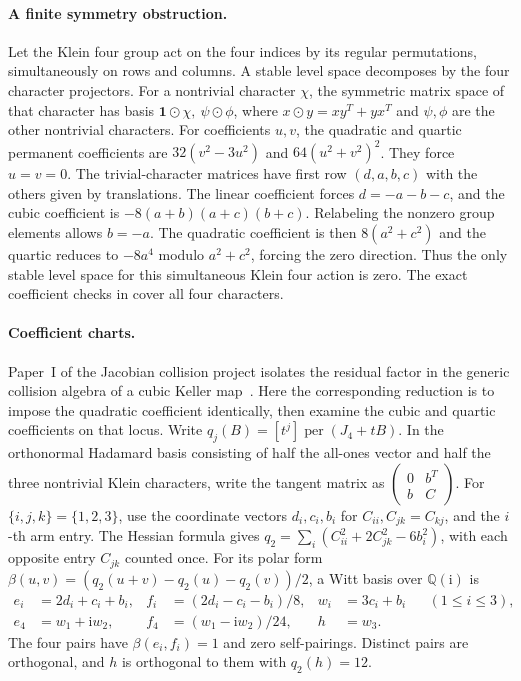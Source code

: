 \paragraph{A finite symmetry obstruction.}
Let the Klein four group act on the four indices by its regular
permutations, simultaneously on rows and columns. A stable level space
decomposes by the four character projectors. For a nontrivial character
\(\chi\), the symmetric matrix space of that character has basis
\(\mathbf1\odot\chi,\ \psi\odot\phi\), where \(x\odot y=xy^T+yx^T\)
and \(\psi,\phi\) are the other nontrivial characters. For coefficients
\(u,v\), the quadratic and quartic permanent coefficients are
\(32(v^2-3u^2)\) and \(64(u^2+v^2)^2\). They force \(u=v=0\).
The trivial-character matrices have first row \((d,a,b,c)\) with the
others given by translations. The linear coefficient forces
\(d=-a-b-c\), and the cubic coefficient is \(-8(a+b)(a+c)(b+c)\).
Relabeling the nonzero group elements allows \(b=-a\). The quadratic
coefficient is then \(8(a^2+c^2)\) and the quartic reduces to
\(-8a^4\) modulo \(a^2+c^2\), forcing the zero direction. Thus the
only stable level space for this simultaneous Klein four action is
zero. The exact coefficient checks in 
cover all four characters.

\paragraph{Coefficient charts.}
Paper~I of the Jacobian collision project isolates the residual factor
in the generic collision algebra of a cubic Keller map~\cite{jc3collision}.
Here the corresponding reduction is to impose the quadratic coefficient
identically, then examine the cubic and quartic coefficients on that locus.
Write \(q_j(B)=[t^j]\operatorname{per}(J_4+tB)\). In the orthonormal
Hadamard basis consisting of half the all-ones vector and half the
three nontrivial Klein characters, write the tangent matrix as
\(\left(\begin{smallmatrix}0&b^T\\b&C\end{smallmatrix}\right)\).
For \(\{i,j,k\}=\{1,2,3\}\), use the coordinate vectors \(d_i,c_i,b_i\)
for \(C_{ii}, C_{jk}=C_{kj}\), and the \(i\)-th arm entry. The Hessian
formula gives \(q_2=\sum_i(C_{ii}^2+2C_{jk}^2-6b_i^2)\), with each
opposite entry \(C_{jk}\) counted once. For its polar form
\(\beta(u,v)=(q_2(u+v)-q_2(u)-q_2(v))/2\), a Witt basis over
\(\mathbb Q(\mathrm i)\) is
\begin{align*}
 e_i &= 2d_i+c_i+b_i,& f_i &= (2d_i-c_i-b_i)/8,& w_i &=3c_i+b_i
    && (1\le i\le 3),\\
 e_4 &= w_1+\mathrm i w_2,& f_4 &= (w_1-\mathrm i w_2)/24,& h &= w_3.
\end{align*}
The four pairs have \(\beta(e_i,f_i)=1\) and zero self-pairings.
Distinct pairs are orthogonal, and \(h\) is orthogonal to them with
\(q_2(h)=12\).


